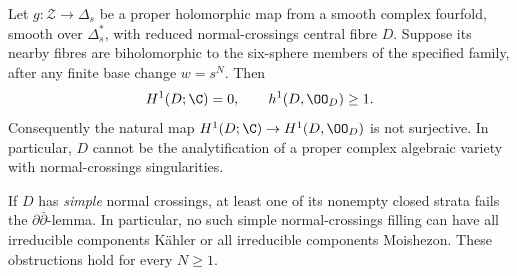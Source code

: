 \begin{theorem}\hypertarget{tag-030Z}{}\label{push:src:B.4.3}

Let $g:\mathcal Z\to\Delta_s$ be a proper holomorphic map from a
smooth complex fourfold, smooth over $\Delta_s^*$, with reduced
normal-crossings central fibre $D$. Suppose its nearby fibres are
biholomorphic to the six-sphere members of the specified family,
after any finite base change $w=s^N$. Then
\[
 H^1(D;\C)=0,\qquad h^1(D,\OO_D)\geq1.
\]
Consequently the natural map
$H^1(D;\C)\to H^1(D,\OO_D)$ is not surjective. In particular,
$D$ cannot be the analytification of a proper complex algebraic
variety with normal-crossings singularities.

If $D$ has \emph{simple} normal crossings, at least one of its
nonempty closed strata fails the $\partial\bar\partial$-lemma.
In particular, no such simple normal-crossings filling can have
all irreducible components K\"ahler or all irreducible components
Moishezon. These obstructions hold for every $N\geq1$.
\end{theorem}

